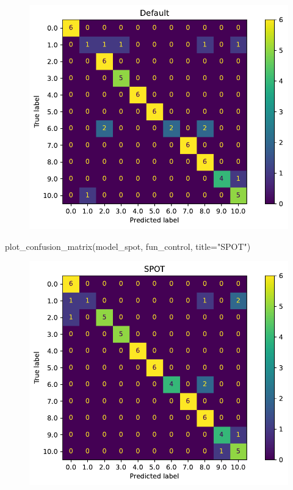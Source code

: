\documentclass[
  letterpaper,
  DIV=11,
  numbers=noendperiod]{scrreprt}
\newenvironment{Shaded}{\begin{snugshade}}{\end{snugshade}}
\newcommand{\NormalTok}[1]{\textcolor[rgb]{0.00,0.23,0.31}{#1}}
\newcommand{\OperatorTok}[1]{\textcolor[rgb]{0.37,0.37,0.37}{#1}}
\newcommand{\StringTok}[1]{\textcolor[rgb]{0.13,0.47,0.30}{#1}}
\begin{document}
\begin{figure}[H]

{\centering \includegraphics{17_spot_hpt_sklearn_multiclass_classification_xgb_files/figure-pdf/cell-40-output-1.pdf}

}

\end{figure}

\begin{Shaded}
\begin{Highlighting}[]
\NormalTok{plot\_confusion\_matrix(model\_spot, fun\_control, title}\OperatorTok{=}\StringTok{"SPOT"}\NormalTok{)}
\end{Highlighting}
\end{Shaded}

\begin{figure}[H]

{\centering \includegraphics{17_spot_hpt_sklearn_multiclass_classification_xgb_files/figure-pdf/cell-41-output-1.pdf}

}

\end{figure}
\end{document}
